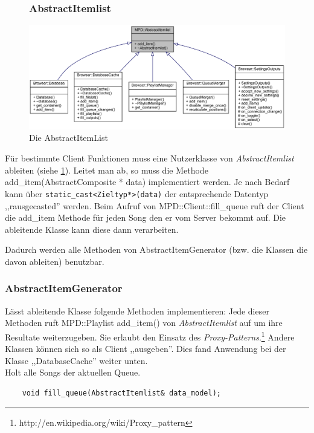 \newpage
\begin{figure}[htb!]
\subsubsection{AbstractItemlist}
    \centering
    \includegraphics[width=\textwidth]{./gfx/class/abstractitemlist}
    \caption{Die AbstractItemList}
    \label{c_abstract_item_list}
\end{figure}

Für bestimmte Client Funktionen muss eine Nutzerklasse von \emph{AbstractItemlist} ableiten (siehe \ref{c_abstract_item_list}).
Leitet man ab, so muss die Methode add\_item(AbstractComposite * data) implementiert werden. 
Je nach Bedarf kann über \verb+static_cast<Zieltyp*>(data)+ der entsprechende Datentyp ,,rausgecasted'' werden.
Beim Aufruf von MPD::Client::fill\_queue ruft der Client die add\_item Methode für jeden 
Song den er vom Server bekommt auf. Die ableitende Klasse kann diese dann verarbeiten.

Dadurch werden alle Methoden von AbstractItemGenerator (bzw. die Klassen die davon ableiten) benutzbar.

\newpage
\subsubsection{AbstractItemGenerator}
%
%
%

Lässt ableitende Klasse folgende Methoden implementieren:
Jede dieser Methoden ruft MPD::Playlist add\_item() von \emph{AbstractItemlist} auf um ihre Resultate weiterzugeben.
Sie erlaubt den Einsatz des \emph{Proxy-Patterns}.\footnote{http://en.wikipedia.org/wiki/Proxy\_pattern}
Andere Klassen können sich so als Client ,,ausgeben''.
Dies fand Anwendung bei der Klasse ,,DatabaseCache'' weiter unten.
\\
Holt alle Songs der aktuellen Queue.
\begin{verbatim}            
    void fill_queue(AbstractItemlist& data_model);
\end{verbatim}

